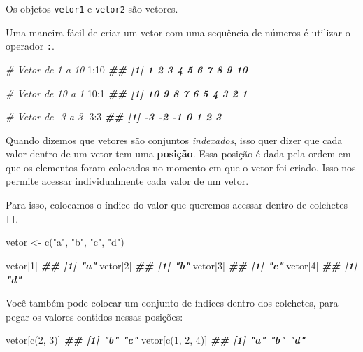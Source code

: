 \documentclass[
]{book}
\newenvironment{Shaded}{\begin{snugshade}}{\end{snugshade}}
\newcommand{\CommentTok}[1]{\textcolor[rgb]{0.56,0.35,0.01}{\textit{#1}}}
\newcommand{\DecValTok}[1]{\textcolor[rgb]{0.00,0.00,0.81}{#1}}
\newcommand{\DocumentationTok}[1]{\textcolor[rgb]{0.56,0.35,0.01}{\textbf{\textit{#1}}}}
\newcommand{\FunctionTok}[1]{\textcolor[rgb]{0.00,0.00,0.00}{#1}}
\newcommand{\NormalTok}[1]{#1}
\newcommand{\OtherTok}[1]{\textcolor[rgb]{0.56,0.35,0.01}{#1}}
\newcommand{\SpecialCharTok}[1]{\textcolor[rgb]{0.00,0.00,0.00}{#1}}
\newcommand{\StringTok}[1]{\textcolor[rgb]{0.31,0.60,0.02}{#1}}
\begin{document}
Os objetos \texttt{vetor1} e \texttt{vetor2} são vetores.

Uma maneira fácil de criar um vetor com uma sequência de números é utilizar o operador \texttt{:}.

\begin{Shaded}
\begin{Highlighting}[]
\CommentTok{\# Vetor de 1 a 10}
\DecValTok{1}\SpecialCharTok{:}\DecValTok{10}
\DocumentationTok{\#\#  [1]  1  2  3  4  5  6  7  8  9 10}

\CommentTok{\# Vetor de 10 a 1}
\DecValTok{10}\SpecialCharTok{:}\DecValTok{1}
\DocumentationTok{\#\#  [1] 10  9  8  7  6  5  4  3  2  1}

\CommentTok{\# Vetor de {-}3 a 3}
\SpecialCharTok{{-}}\DecValTok{3}\SpecialCharTok{:}\DecValTok{3}
\DocumentationTok{\#\# [1] {-}3 {-}2 {-}1  0  1  2  3}
\end{Highlighting}
\end{Shaded}

Quando dizemos que vetores são conjuntos \emph{indexados}, isso quer dizer que cada valor dentro de um vetor tem uma \textbf{posição}. Essa posição é dada pela ordem em que os elementos foram colocados no momento em que o vetor foi criado. Isso nos permite acessar individualmente cada valor de um vetor.

Para isso, colocamos o índice do valor que queremos acessar dentro de colchetes \texttt{{[}{]}}.

\begin{Shaded}
\begin{Highlighting}[]
\NormalTok{vetor }\OtherTok{\textless{}{-}} \FunctionTok{c}\NormalTok{(}\StringTok{"a"}\NormalTok{, }\StringTok{"b"}\NormalTok{, }\StringTok{"c"}\NormalTok{, }\StringTok{"d"}\NormalTok{)}

\NormalTok{vetor[}\DecValTok{1}\NormalTok{]}
\DocumentationTok{\#\# [1] "a"}
\NormalTok{vetor[}\DecValTok{2}\NormalTok{]}
\DocumentationTok{\#\# [1] "b"}
\NormalTok{vetor[}\DecValTok{3}\NormalTok{]}
\DocumentationTok{\#\# [1] "c"}
\NormalTok{vetor[}\DecValTok{4}\NormalTok{]}
\DocumentationTok{\#\# [1] "d"}
\end{Highlighting}
\end{Shaded}

Você também pode colocar um conjunto de índices dentro dos colchetes, para pegar os valores contidos nessas posições:

\begin{Shaded}
\begin{Highlighting}[]
\NormalTok{vetor[}\FunctionTok{c}\NormalTok{(}\DecValTok{2}\NormalTok{, }\DecValTok{3}\NormalTok{)]}
\DocumentationTok{\#\# [1] "b" "c"}
\NormalTok{vetor[}\FunctionTok{c}\NormalTok{(}\DecValTok{1}\NormalTok{, }\DecValTok{2}\NormalTok{, }\DecValTok{4}\NormalTok{)]}
\DocumentationTok{\#\# [1] "a" "b" "d"}
\end{Highlighting}
\end{Shaded}
\end{document}
